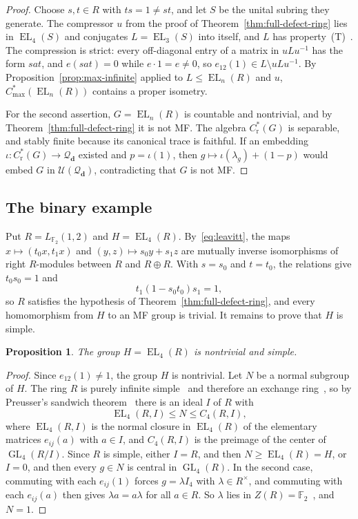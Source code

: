 \documentclass[11pt]{amsart}
\newcommand{\leanverified}[2]{\ignorespaces}
\newtheorem{proposition}[theorem]{Proposition}
\theoremstyle{plain}
\newcommand{\F}{\mathbb F}
\newcommand{\GL}{\operatorname{GL}}
\newcommand{\EL}{\operatorname{EL}}
\newcommand{\U}{\mathcal U}
\begin{document}
\begin{proof}
Choose $s,t\in R$ with $ts=1\ne st$, and let $S$ be the unital subring
they generate.  The compressor $u$ from the proof of
Theorem~\ref{thm:full-defect-ring} lies in $\EL_4(S)$ and conjugates
$L=\EL_3(S)$ into itself, and $L$ has
property~\textup{(T)}~\cite[Theorem~1.1]{EJZ}.  The compression is
strict: every off-diagonal entry of a matrix in $uLu^{-1}$ has the form
$sat$, and $e(sat)=0$ while $e\cdot1=e\ne0$, so
$e_{12}(1)\in L\setminus uLu^{-1}$.  By
Proposition~\ref{prop:max-infinite} applied to $L\le\EL_n(R)$ and $u$,
$C^*_{\max}(\EL_n(R))$ contains a proper isometry.

For the second assertion, $G=\EL_n(R)$ is countable and nontrivial, and
by Theorem~\ref{thm:full-defect-ring} it is not MF\@.  The algebra
$C^*_{\mathrm r}(G)$ is separable, and stably finite because its
canonical trace is faithful.  If an embedding
$\iota\colon C^*_{\mathrm r}(G)\to\mathcal Q_{\mathbf d}$ existed and
$p=\iota(1)$, then $g\mapsto\iota(\lambda_g)+(1-p)$ would embed $G$ in
$\U(\mathcal Q_{\mathbf d})$, contradicting that $G$ is not MF\@.
\end{proof}

\subsection{The binary example}

Put $R=L_{\F_2}(1,2)$ and $H=\EL_4(R)$.  By~\eqref{eq:leavitt}, the
maps $x\mapsto(t_0x,t_1x)$ and $(y,z)\mapsto s_0y+s_1z$ are mutually
inverse isomorphisms of right $R$-modules between $R$ and $R\oplus R$.
With $s=s_0$ and $t=t_0$, the relations give $t_0s_0=1$ and
\[
 t_1(1-s_0t_0)s_1=1,
\]
so $R$ satisfies the hypothesis of Theorem~\ref{thm:full-defect-ring},
and every homomorphism from $H$ to an MF group is trivial.  It remains
to prove that $H$ is simple.

\begin{proposition}\label{prop:simple}
The group $H=\EL_4(R)$ is nontrivial and simple.
\leanverified{Manuscript/OneSidedMFRadical/RankTwelveSimplicity}{GroupApproximation.Manuscript.OneSidedMFRadical.RankTwelveEndpoint.manuscriptPropositionSimple}
\end{proposition}

\begin{proof}
Since $e_{12}(1)\ne1$, the group $H$ is nontrivial.  Let $N$ be a normal
subgroup of $H$.  The ring $R$ is purely infinite
simple~\cite{AbramsAranda} and therefore an exchange
ring~\cite{AraExchange}, so by Preusser's sandwich
theorem~\cite[Theorem~3]{Preusser} there is an ideal $I$ of $R$ with
\[
 \EL_4(R,I)\le N\le C_4(R,I),
\]
where $\EL_4(R,I)$ is the normal closure in $\EL_4(R)$ of the
elementary matrices $e_{ij}(a)$ with $a\in I$, and $C_4(R,I)$ is the
preimage of the center of $\GL_4(R/I)$.  Since $R$ is simple, either
$I=R$, and then $N\ge\EL_4(R)=H$, or $I=0$, and then every $g\in N$ is
central in $\GL_4(R)$.  In the second case, commuting with each
$e_{ij}(1)$ forces $g=\lambda I_4$ with $\lambda\in R^\times$, and
commuting with each $e_{ij}(a)$ then gives $\lambda a=a\lambda$ for all
$a\in R$.  So $\lambda$ lies in
$Z(R)=\F_2$~\cite[Corollary~4.3]{ArandaCrow}, and $N=1$.
\end{proof}
\end{document}
